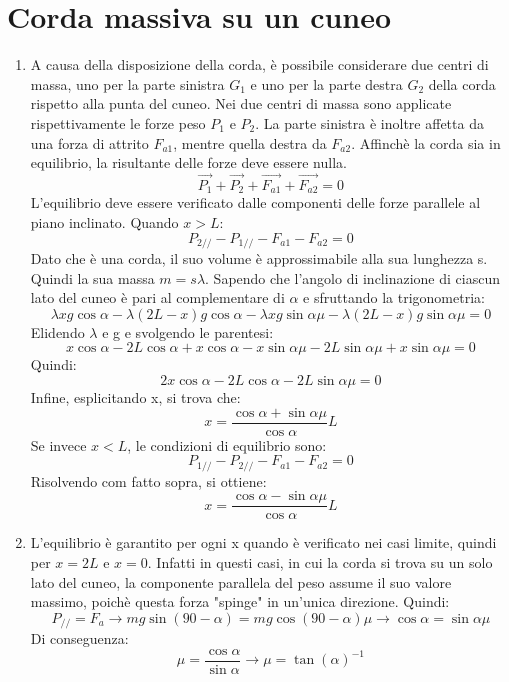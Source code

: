 \documentclass[]{article}
\begin{document}
\section{Corda massiva su un cuneo}
	\begin{enumerate}
		\item A causa della disposizione della corda, è possibile considerare due centri di massa, uno per la parte sinistra $G_1$ e uno per la parte destra $G_2$ della corda rispetto alla punta del cuneo. Nei due centri di massa sono applicate rispettivamente le forze peso $P_1$ e $P_2$. La parte sinistra è inoltre affetta da una forza di attrito $F_{a1}$, mentre quella destra da $F_{a2}$. Affinchè la corda sia in equilibrio, la risultante delle forze deve essere nulla.
		$$\vec{P_1}+\vec{P_2}+\vec{F_{a1}}+\vec{F_{a2}}=0$$
		 L'equilibrio deve essere verificato dalle componenti delle forze parallele al piano inclinato. Quando $x>L$:
		 $$P_{2//}-P_{1//}-F_{a1}-F_{a2}=0$$
		Dato che è una corda, il suo volume è approssimabile alla sua lunghezza s. Quindi la sua massa $m=s\lambda$. Sapendo che l'angolo di inclinazione di ciascun lato del cuneo è pari al complementare di $\alpha$ e sfruttando la trigonometria:
		$$\lambda xg\cos{\alpha}-\lambda(2L-x)g\cos{\alpha}-\lambda xg\sin{\alpha}\mu-\lambda(2L-x)g\sin{\alpha}\mu=0$$
		Elidendo $\lambda$ e g e svolgendo le parentesi:
		$$x\cos{\alpha}-2L\cos{\alpha}+x\cos{\alpha}-x\sin{\alpha}\mu-2L\sin{\alpha}\mu+x\sin{\alpha}\mu=0$$
		Quindi:
		$$2x\cos{\alpha}-2L\cos{\alpha}-2L\sin{\alpha}\mu=0$$
		Infine, esplicitando x, si trova che:
		$$x=\frac{\cos{\alpha}+\sin{\alpha}\mu}{\cos{\alpha}}L$$
		Se invece $x<L$, le condizioni di equilibrio sono:
		$$P_{1//}-P_{2//}-F_{a1}-F_{a2}=0$$
		Risolvendo com fatto sopra, si ottiene:
		$$x=\frac{\cos{\alpha}-\sin{\alpha}\mu}{\cos{\alpha}}L$$
		\item L'equilibrio è garantito per ogni x quando è verificato nei casi limite, quindi per $x=2L$ e $ x=0$. Infatti in questi casi, in cui la corda si trova su un solo lato del cuneo, la componente parallela del peso assume il suo valore massimo, poichè questa forza "spinge" in un'unica direzione. Quindi:
		$$P_{//}=F_a \rightarrow mg\sin({90-\alpha})=mg\cos({90-\alpha})\mu \rightarrow \cos{\alpha}=\sin{\alpha}\mu$$
		Di conseguenza:
		$$\mu=\frac{\cos{\alpha}}{\sin{\alpha}} \rightarrow \mu=\tan({\alpha})^{-1}$$
	\end{enumerate}
\end{document}
